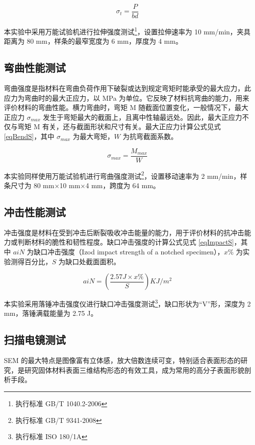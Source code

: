 \begin{equation}
    \label{eqTenS}
    \sigma_t = \frac{P}{bd}
\end{equation}

本实验中采用万能试验机进行拉伸强度测试\footnote{执行标准 GB/T 1040.2-2006}，设置拉伸速率为 10 mm/min，夹具距离为 80 mm，样条的最窄宽度为 6 mm，厚度为 4 mm。

\subsection{弯曲性能测试}
弯曲强度是指材料在弯曲负荷作用下破裂或达到规定弯矩时能承受的最大应力，此应力为弯曲时的最大正应力，以 MPa 为单位。它反映了材料抗弯曲的能力，用来评价材料的弯曲性能。横力弯曲时，弯矩 M 随截面位置变化，一般情况下，最大正应力 $\sigma_{max}$ 发生于弯矩最大的截面上，且离中性轴最远处。因此，最大正应力不仅与弯矩 M 有关，还与截面形状和尺寸有关。最大正应力计算公式见式 \eqref{eqBendS}，其中 $\sigma_{max}$ 为最大弯矩，$W$ 为抗弯截面系数。

\begin{equation}
    \label{eqBendS}
    \sigma_{max} = \frac{M_{max}}{W}
\end{equation}

本实验同样使用万能试验机进行弯曲强度测试\footnote{执行标准 GB/T 9341-2008}，设置移动速率为 2 mm/min，样条尺寸为 80 mm$\times$10 mm$\times$4 mm，跨度为 64 mm。

\subsection{冲击性能测试}
冲击强度是材料在受到冲击后断裂吸收冲击能量的能力，用于评价材料的抗冲击能力或判断材料的脆性和韧性程度。缺口冲击强度的计算公式见式 \eqref{eqImpactS}，其中 $aiN$ 为缺口冲击强度（Izod impact strength of a notched specimen），$x\%$ 为实验测得百分比，$S$ 为缺口处截面面积。

\begin{equation}
    \label{eqImpactS}
    aiN = (\frac{2.57 J \times x\%}{S}) KJ/m^2
\end{equation}

本实验采用落锤冲击强度仪进行缺口冲击强度测试\footnote{执行标准 ISO 180/1A}，缺口形状为“V”形，深度为 2 mm，落锤满载能量为 2.75 J。

\subsection{扫描电镜测试}
SEM 的最大特点是图像富有立体感，放大倍数连续可变，特别适合表面形态的研究，是研究固体材料表面三维结构形态的有效工具，成为常用的高分子表面形貌剖析手段。

